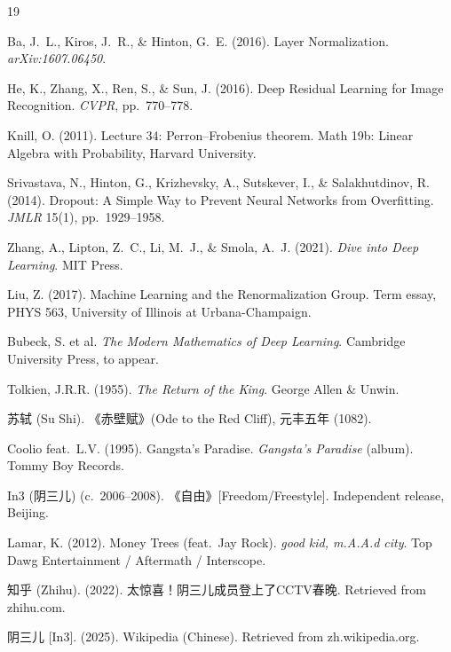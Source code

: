 \documentclass[11pt,a4paper]{article}
\theoremstyle{definition}
\theoremstyle{remark}
\begin{document}
\begin{thebibliography}{19}

Ba, J.~L., Kiros, J.~R., \& Hinton, G.~E. (2016). Layer Normalization. \textit{arXiv:1607.06450}.

He, K., Zhang, X., Ren, S., \& Sun, J. (2016). Deep Residual Learning for Image Recognition. \textit{CVPR}, pp.~770--778.

Knill, O. (2011). Lecture 34: Perron--Frobenius theorem. Math 19b: Linear Algebra with Probability, Harvard University.

Srivastava, N., Hinton, G., Krizhevsky, A., Sutskever, I., \& Salakhutdinov, R. (2014). Dropout: A Simple Way to Prevent Neural Networks from Overfitting. \textit{JMLR} 15(1), pp.~1929--1958.

Zhang, A., Lipton, Z.~C., Li, M.~J., \& Smola, A.~J. (2021). \textit{Dive into Deep Learning}. MIT Press.

Liu, Z. (2017). Machine Learning and the Renormalization Group. Term essay, PHYS 563, University of Illinois at Urbana-Champaign.

Bubeck, S. et al. \textit{The Modern Mathematics of Deep Learning}. Cambridge University Press, to appear.

Tolkien, J.R.R. (1955). \textit{The Return of the King}. George Allen \& Unwin.

苏轼 (Su Shi). 《赤壁赋》(Ode to the Red Cliff), 元丰五年 (1082).

Coolio feat.\ L.V. (1995). Gangsta's Paradise. \textit{Gangsta's Paradise} (album). Tommy Boy Records.

In3 (阴三儿) (c.\ 2006--2008). 《自由》[Freedom/Freestyle]. Independent release, Beijing.

Lamar, K. (2012). Money Trees (feat.\ Jay Rock). \textit{good kid, m.A.A.d city}. Top Dawg Entertainment / Aftermath / Interscope.

知乎 (Zhihu). (2022). 太惊喜！阴三儿成员登上了CCTV春晚. Retrieved from zhihu.com.

阴三儿 [In3]. (2025). Wikipedia (Chinese). Retrieved from zh.wikipedia.org.


\end{thebibliography}
\end{document}

